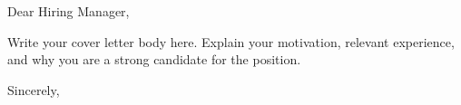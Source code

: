 \begin{letter}{
    \school{}
  }

  \opening{Dear Hiring Manager,}

  Write your cover letter body here. Explain your motivation, relevant experience, and why you are a strong candidate for the position.

  \lipsum[1]

  \closing{Sincerely,}
\end{letter}
